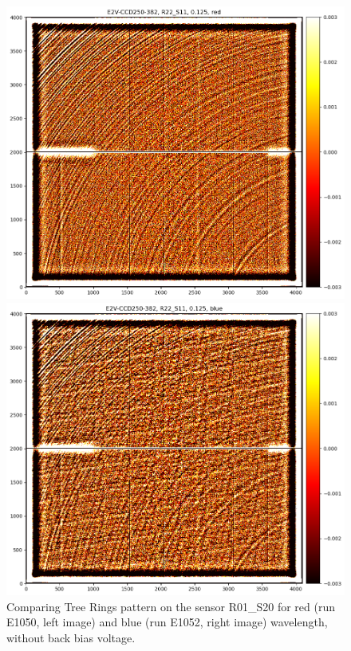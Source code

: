 \begin{figure}[ht]
\centering
\begin{minipage}[b]{0.45\textwidth}
\centering
\includegraphics[width=\textwidth]{figures/R22_S11_red.png}
\end{minipage}
\begin{minipage}[b]{0.45\textwidth}
\centering
\includegraphics[width=\textwidth]{figures/R22_S11_blue.png}
\end{minipage}
\caption{Comparing Tree Rings pattern on the sensor R01\_S20 for red (run E1050, left image) and blue (run E1052, right image) wavelength, without back bias voltage.}
\label{fig:tree_ring_wavelength_dep}
\end{figure}

